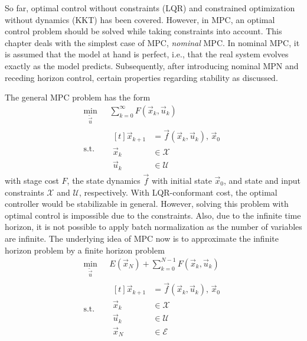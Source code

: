 	So far, optimal control without constraints (LQR) and constrained optimization without dynamics (KKT) has been covered. However, in MPC, an optimal control problem should be solved while taking constraints into account. This chapter deals with the simplest case of MPC, \emph{nominal} MPC. In nominal MPC, it is assumed that the model at hand is perfect, i.e., that the real system evolves exactly as the model predicts. Subsequently, after introducing nominal MPN and receding horizon control, certain properties regarding stability as discussed.

	The general MPC problem has the form
	\begin{align}
		\min_{\tilde{\vec{u}}}\; & \sum_{k = 0}^{\infty} F(\vec{x}_k, \vec{u}_k) \\
		\text{s.t.}\quad         &
		\begin{aligned}[t]
			\vec{x}_{k + 1} & = \vec{f}(\vec{x}_k, \vec{u}_k),\, \vec{x}_0 \\
			\vec{x}_k       & \in \mathcal{X}                              \\
			\vec{u}_k       & \in \mathcal{U}
		\end{aligned}
	\end{align}
	with stage cost \(F\), the state dynamics \(\vec{f}\) with initial state \(\vec{x}_0\), and state and input constraints \(\mathcal{X}\) and \(\mathcal{U}\), respectively. With LQR-conformant cost, the optimal controller would be stabilizable in general. However, solving this problem with optimal control is impossible due to the constraints. Also, due to the infinite time horizon, it is not possible to apply batch normalization as the number of variables are infinite. The underlying idea of MPC now is to approximate the infinite horizon problem by a finite horizon problem
	\begin{equation}
		\begin{aligned}
			\min_{\tilde{\vec{u}}}\, & E(\vec{x}_N) + \sum_{k = 0}^{N - 1} F(\vec{x}_k, \vec{u}_k) \\
			\text{s.t.}\quad         &
			\begin{aligned}[t]
				\vec{x}_{k + 1} & = \vec{f}(\vec{x}_k, \vec{u}_k),\, \vec{x}_0 \\
				\vec{x}_k       & \in \mathcal{X}                              \\
				\vec{u}_k       & \in \mathcal{U}                              \\
				\vec{x}_N       & \in \mathcal{E}
			\end{aligned}
		\end{aligned}
		\label{eqn:recedingHorizon}
	\end{equation}
